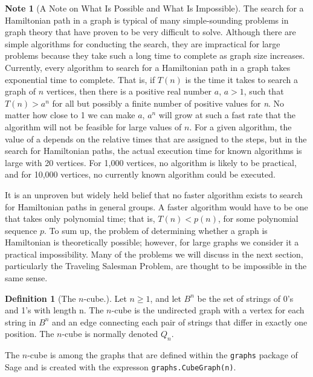\documentclass[10pt,]{book}
\theoremstyle{plain}
\theoremstyle{definition}
\newtheorem{definition}[theorem]{Definition}
\theoremstyle{definition}
\newtheorem{note}[theorem]{Note}
\theoremstyle{definition}
\theoremstyle{definition}
\theoremstyle{definition}
\numberwithin{equation}{section}
\begin{document}
\begin{note}[A Note on What Is Possible and What Is Impossible]\label{note-5}
The search for a Hamiltonian path in a graph is typical of many simple-sounding problems
in graph theory that have proven to be very difficult to solve. Although there are simple algorithms for conducting the search, they are impractical
for large problems because they take such a long time to complete as graph size increases. Currently, every algorithm to search for a Hamiltonian
path in a graph takes exponential time to complete. That is, if \(T(n)\) is the time it takes to search a graph of \(n\) vertices, then there
is a positive real number \(a\), \(a > 1\), such that \(T(n) > a^n\) for all but possibly a finite number of positive values for \textit{
n}. No matter how close to 1 we can make \(a\), \(a^n\) will grow at such a fast rate that the algorithm will not be feasible for large values
of \(n\). For a given algorithm, the value of a depends on the relative times that are assigned to the steps, but in the search for Hamiltonian
paths, the actual execution time for known algorithms is large with 20 vertices. For 1,000 vertices, no algorithm is likely to be practical, and
for 10,000 vertices, no currently known algorithm could be executed.%
\par
It is an unproven but widely held belief that no faster algorithm exists to search for Hamiltonian paths in general groups. A faster algorithm would have to be one
that takes only polynomial time; that is, \(T(n) < p(n)\), for some polynomial sequence \(p\). To sum up, the problem of determining whether
a graph is Hamiltonian is theoretically possible; however, for large graphs we consider it a practical impossibility. Many of the problems we will discuss in the next section, particularly the Traveling Salesman Problem, are thought to be impossible in the same sense. 
%
\end{note}
\begin{definition}[The \(n\)-cube.]\label{def-n-cube}
\label{notation-4}
Let \(n \geq  1\), and let \(B^n\) be the set of strings of 0's and 1's with length n.  The \(n\)-cube is the undirected graph with a vertex for each string in \(B^n\) and an edge connecting each pair of strings that differ in exactly one position. The \(n\)-cube is normally denoted \(Q_n\). %
\end{definition}
\par
The \(n\)-cube is among the graphs that are defined within the \lstinline?graphs? package of Sage and is created with the expresson \lstinline?graphs.CubeGraph(n)?. %
\end{document}
